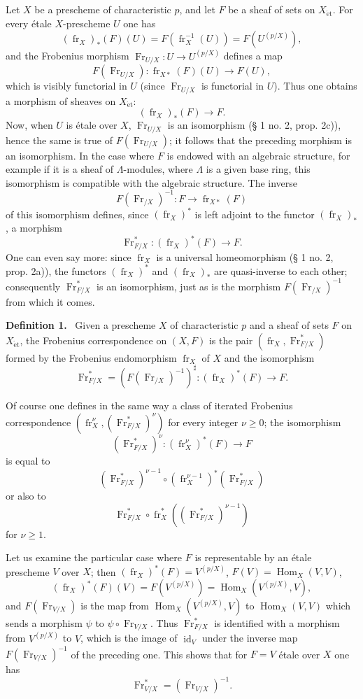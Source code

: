 \documentclass[11pt]{article}
\newenvironment{statement}[1]{\par\medskip\noindent\textbf{#1.}\ }{\par\medskip}
\DeclareMathOperator{\Hom}{Hom}
\providecommand{\et}{\mathrm{\acute{e}t}}
\providecommand{\id}{\operatorname{id}}
\providecommand{\Hom}{\operatorname{Hom}}
\providecommand{\id}{\operatorname{id}}
\providecommand{\id}{\operatorname{id}}
\providecommand{\id}{\operatorname{id}}
\providecommand{\id}{\operatorname{id}}
\providecommand{\Hom}{\operatorname{Hom}}
\providecommand{\fr}{\operatorname{fr}}
\providecommand{\Fr}{\operatorname{Fr}}
\providecommand{\Fr}{\operatorname{Fr}}
\providecommand{\fr}{\operatorname{fr}}
\providecommand{\id}{\operatorname{id}}
\providecommand{\et}{\acute{e}t}
\begin{document}
Let $X$ be a prescheme of characteristic $p$, and let $F$ be a sheaf of sets on $X_{\et}$. For every étale $X$-prescheme $U$ one has
\[
(\fr_X)_*(F)(U)=F(\fr_X^{-1}(U))=F(U^{(p/X)}),
\]
and the Frobenius morphism $\Fr_{U/X}:U\to U^{(p/X)}$ defines a map
\[
F(\Fr_{U/X}):\fr_{X*}(F)(U)\longrightarrow F(U),
\]
which is visibly functorial in $U$ (since $\Fr_{U/X}$ is functorial in $U$). Thus one obtains a morphism of sheaves on $X_{\et}$:
\[
(\fr_X)_*(F)\longrightarrow F.
\]
Now, when $U$ is étale over $X$, $\Fr_{U/X}$ is an isomorphism (§ 1 no. 2, prop. 2c)), hence the same is true of $F(\Fr_{U/X})$; it follows that the preceding morphism is an isomorphism. In the case where $F$ is endowed with an algebraic structure, for example if it is a sheaf of $\Lambda$-modules, where $\Lambda$ is a given base ring, this isomorphism is compatible with the algebraic structure. The inverse
\[
F(\Fr_{/X})^{-1}:F\longrightarrow \fr_{X*}(F)
\]
of this isomorphism defines, since $(\fr_X)^*$ is left adjoint to the functor $(\fr_X)_*$, a morphism
\[
\Fr^*_{F/X}:(\fr_X)^*(F)\longrightarrow F.
\]
One can even say more: since $\fr_X$ is a universal homeomorphism (§ 1 no. 2, prop. 2a)), the functors $(\fr_X)^*$ and $(\fr_X)_*$ are quasi-inverse to each other; consequently $\Fr^*_{F/X}$ is an isomorphism, just as is the morphism $F(\Fr_{/X})^{-1}$ from which it comes.

\label{sga5:XV:definition:1:2}\begin{statement}{Definition 1}
Given a prescheme $X$ of characteristic $p$ and a sheaf of sets $F$ on $X_{\et}$, the Frobenius correspondence on $(X,F)$ is the pair $(\fr_X,\Fr^*_{F/X})$ formed by the Frobenius endomorphism $\fr_X$ of $X$ and the isomorphism
\[
\Fr^*_{F/X}=(F(\Fr_{/X})^{-1})^\sharp:(\fr_X)^*(F)\longrightarrow F.
\]
\end{statement}

Of course one defines in the same way a class of iterated Frobenius correspondence $(\fr_X^\nu,(\Fr^*_{F/X})^\nu)$ for every integer $\nu\geq0$; the isomorphism
\[
(\Fr^*_{F/X})^\nu:(\fr_X^\nu)^*(F)\longrightarrow F
\]
is equal to
\[
(\Fr^*_{F/X})^{\nu-1}\circ (\fr_X^{\nu-1})^*(\Fr^*_{F/X})
\]
or also to
\[
\Fr^*_{F/X}\circ\fr_X^*((\Fr^*_{F/X})^{\nu-1})
\]
for $\nu\geq1$.

Let us examine the particular case where $F$ is representable by an étale prescheme $V$ over $X$; then $(\fr_X)^*(F)=V^{(p/X)}$, $F(V)=\Hom_X(V,V)$,
\[
(\fr_X)^*(F)(V)=F(V^{(p/X)})=\Hom_X(V^{(p/X)},V),
\]
and $F(\Fr_{V/X})$ is the map from $\Hom_X(V^{(p/X)},V)$ to $\Hom_X(V,V)$ which sends a morphism $\psi$ to $\psi\circ\Fr_{V/X}$. Thus $\Fr^*_{F/X}$ is identified with a morphism from $V^{(p/X)}$ to $V$, which is the image of $\id_V$ under the inverse map $F(\Fr_{V/X})^{-1}$ of the preceding one. This shows that for $F=V$ étale over $X$ one has
\[
\Fr^*_{V/X}=(\Fr_{V/X})^{-1}.
\]
\end{document}
